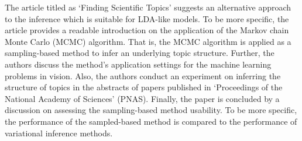 \documentclass{mprop}
\begin{document}
\par The article titled as `Finding Scientific Topics' \cite{griffiths} suggests an alternative approach to the inference which is suitable for LDA-like models. To be more specific, the article provides a readable introduction on the application of the Markov chain Monte Carlo (MCMC) algorithm. That is, the MCMC algorithm is applied as a sampling-based method to infer an underlying topic structure. Further, the authors discuss the method's application settings for the machine learning problems in vision. Also, the authors conduct an experiment on inferring the structure of topics in the abstracts of papers published in `Proceedings of the National Academy of Sciences' (PNAS). Finally, the paper is concluded by a discussion on assessing the sampling-based method usability. To be more specific, the performance of the sampled-based method is compared to the performance of variational inference methods. 
\end{document}
